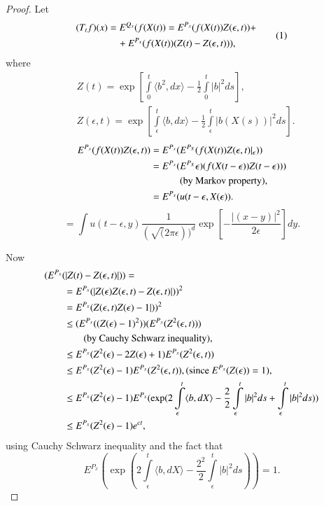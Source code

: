 \begin{proof}
Let
\begin{equation*}
\begin{split}
(T_{t}f)(x) &= E^{Q_{x}}(f(X(t))=E^{P_{x}}(f(X(t))Z(\epsilon,t))+\\
&\quad +E^{P_{x}}(f(X(t))(Z(t)-Z(\epsilon,t))),
\end{split}\tag{1}\label{chap31-eq1}
\end{equation*}
where
\begin{align*}
& Z(t)=\exp \left[\int\limits^{t}_{0}\langle b^{2},dx\rangle
  -\frac{1}{2}\int\limits^{t}_{0}|b|^{2}ds\right],\\
& Z(\epsilon,t)=\exp \left[\int\limits^{t}_{\epsilon}\langle
    b,dx\rangle -\frac{1}{2}\int\limits^{t}_{\epsilon}|b(X(s))|^{2}ds\right].
\end{align*}
\begin{align*}
E^{P_{x}}(f(X(t))Z(\epsilon,t)) &=
E^{P_{x}}(E^{P_{X}}(f(X(t))Z(\epsilon,t)|_{\epsilon}))\\ 
&= E^{P_{x}}(E^{P_{X}}\epsilon)(f(X(t-\epsilon))Z(t-\epsilon)))\\
&\qquad\quad \text{(by Markov property),}\\
&= E^{P_{x}}(u(t-\epsilon , X(\epsilon)).
\end{align*}
\begin{equation*}
=\int u(t-\epsilon, y)\frac{1}{(\surd (2\pi \epsilon))^{d}}\exp
\left[-\frac{|(x-y)|^{2}}{2\epsilon}\right]dy.\tag{2}\label{chap31-eq2} 
\end{equation*}

Now
\begin{align*}
& (E^{P_{x}}(|Z(t)-Z(\epsilon,t)|))=\\
&\qquad =E^{P_{x}}(|Z(\epsilon)Z(\epsilon,t)-Z(\epsilon,t)|))^{2}\\
&\qquad =E^{P_{x}}(Z(\epsilon,t)Z(\epsilon)-1|))^{2}\\
&\qquad \leq
  (E^{P_{x}}((Z(\epsilon)-1)^{2}))(E^{P_{x}}(Z^{2}(\epsilon,t)))\\
&\qquad\qquad \text{(by Cauchy Schwarz inequality),}\\
&\qquad \leq
  E^{P_{x}}(Z^{2}(\epsilon)-2Z(\epsilon)+1)E^{P_{x}}(Z^{2}(\epsilon,t))\\
&\qquad \leq
  E^{P_{x}}(Z^{2}(\epsilon)-1)E^{P_{x}}(Z^{2}(\epsilon,t)),(\text{since~
  } E^{P_{x}}(Z(\epsilon))=1),\\
&\qquad \leq E^{P_{x}}(Z^{2}(\epsilon)-1)E^{P_{x}}(\exp
  (2\int\limits^{t}_{\epsilon}\langle b,dX\rangle
  -\frac{2}{2}\int\limits^{t}_{\epsilon}|b|^{2}ds+\int\limits^{t}_{\epsilon}|b|^{2}ds))\\
&\qquad \leq E^{P_{x}}(Z^{2}(\epsilon)-1)e^{ct},
\end{align*}\pageoriginale
using Cauchy Schwarz inequality and the fact that
$$
E^{P_{x}}(\exp (2\int\limits^{t}_{\epsilon}\langle b,dX\rangle
-\frac{2^{2}}{2}\int\limits^{t}_{\epsilon}|b|^{2}ds))=1. 
$$


\end{proof}
